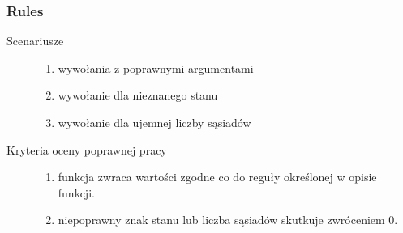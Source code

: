 \documentclass[a4paper,11pt]{article}
\begin{document}
\subsubsection{Rules}
\begin{description}

\item[Scenariusze] \hfill
\begin{enumerate}
\item wywołania z poprawnymi argumentami
\item wywołanie dla nieznanego stanu
\item wywołanie dla ujemnej liczby sąsiadów
\end{enumerate}

\item[Kryteria oceny poprawnej pracy] \hfill
\begin{enumerate}
\item funkcja zwraca wartości zgodne co do reguły określonej w opisie funkcji.
\item niepoprawny znak stanu lub liczba sąsiadów skutkuje zwróceniem 0.

\end{enumerate}

\end{description}
\end{document}
